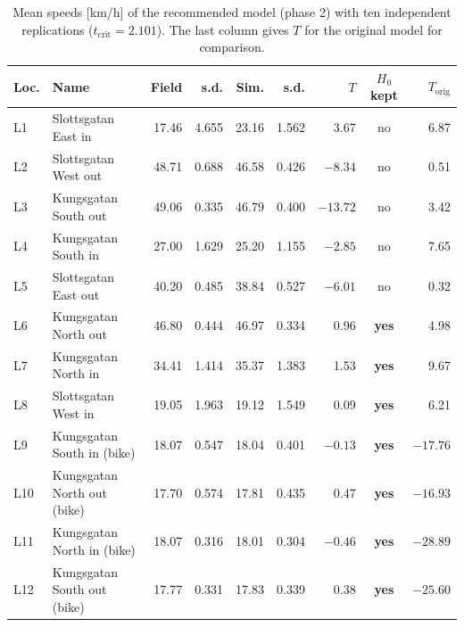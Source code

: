 \documentclass[11pt,a4paper]{article}
\newcommand{\pass}{\textcolor{okgreen}{\textbf{yes}}}
\newcommand{\fail}{\textcolor{failred}{no}}
\begin{document}
\begin{table}[!htb]
\centering
\caption[Location-wise speed validation]{Mean speeds [km/h] of the recommended model (phase 2) with
ten independent replications ($t_{\mathrm{crit}} = 2.101$). The last column gives $T$ for the
original model for comparison.}
\label{tab:locval}
\small
\setlength{\tabcolsep}{5pt}
\begin{tabular}{llrrrrrcr}
\toprule
\textbf{Loc.} & \textbf{Name} & \textbf{Field} & \textbf{s.d.} & \textbf{Sim.} & \textbf{s.d.} & $T$ & \textbf{$H_0$ kept} & $T_{\mathrm{orig}}$\\
\midrule
L1  & Slottsgatan East in         & 17.46 & 4.655 & 23.16 & 1.562 &   3.67   & \fail &   6.87\\
L2  & Slottsgatan West out        & 48.71 & 0.688 & 46.58 & 0.426 &  $-8.34$ & \fail &   0.51\\
L3  & Kungsgatan South out        & 49.06 & 0.335 & 46.79 & 0.400 & $-13.72$ & \fail &   3.42\\
L4  & Kungsgatan South in         & 27.00 & 1.629 & 25.20 & 1.155 &  $-2.85$ & \fail &   7.65\\
L5  & Slottsgatan East out        & 40.20 & 0.485 & 38.84 & 0.527 &  $-6.01$ & \fail &   0.32\\
L6  & Kungsgatan North out        & 46.80 & 0.444 & 46.97 & 0.334 &   0.96   & \pass &   4.98\\
L7  & Kungsgatan North in         & 34.41 & 1.414 & 35.37 & 1.383 &   1.53   & \pass &   9.67\\
L8  & Slottsgatan West in         & 19.05 & 1.963 & 19.12 & 1.549 &   0.09   & \pass &   6.21\\
L9  & Kungsgatan South in (bike)  & 18.07 & 0.547 & 18.04 & 0.401 &  $-0.13$ & \pass & $-17.76$\\
L10 & Kungsgatan North out (bike) & 17.70 & 0.574 & 17.81 & 0.435 &   0.47   & \pass & $-16.93$\\
L11 & Kungsgatan North in (bike)  & 18.07 & 0.316 & 18.01 & 0.304 &  $-0.46$ & \pass & $-28.89$\\
L12 & Kungsgatan South out (bike) & 17.77 & 0.331 & 17.83 & 0.339 &   0.38   & \pass & $-25.60$\\
\bottomrule
\end{tabular}
\end{table}
\end{document}
